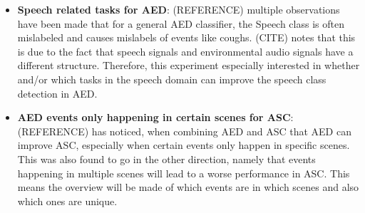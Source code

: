 	\begin{itemize}
		\item \textbf{Speech related tasks for AED}: (REFERENCE) multiple observations have been made that for a general AED classifier, the Speech class is often mislabeled and causes mislabels of events like coughs. (CITE) notes that this is due to the fact that speech signals and environmental audio signals have a different structure. Therefore, this experiment especially interested in whether and/or which tasks in the speech domain can improve the speech class detection in AED. 
		\item \textbf{AED events only happening in certain scenes for ASC}: (REFERENCE) has noticed, when combining AED and ASC that AED can improve ASC, especially when certain events only happen in specific scenes. This was also found to go in the other direction, namely that events happening in multiple scenes will lead to a worse performance in ASC. This means the overview will be made of which events are in which scenes and also which ones are unique. 
	\end{itemize}
